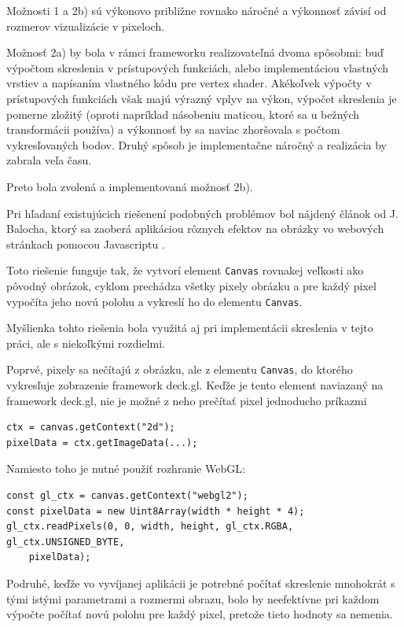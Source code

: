 Možnosti 1 a 2b) sú výkonovo približne rovnako náročné a výkonnosť závisí od rozmerov vizualizácie v pixeloch.

Možnosť 2a) by bola v rámci frameworku realizovateľná dvoma spôsobmi: buď výpočtom skreslenia v prístupových funkciách, alebo implementáciou vlastných vrstiev a napísaním vlastného kódu pre vertex shader. Akékoľvek výpočty v prístupových funkciách však majú výrazný vplyv na výkon, výpočet skreslenia je pomerne zložitý (oproti napríklad násobeniu maticou, ktoré sa u bežných transformácii používa) a výkonnosť by sa naviac zhoršovala s počtom vykresľovaných bodov. Druhý spôsob je implementačne náročný a realizácia by zabrala veľa času.

Preto bola zvolená a implementovaná možnosť 2b).

Pri hľadaní existujúcich riešenení podobných problémov bol nájdený článok od J. Balocha, ktorý sa zaoberá aplikáciou rôznych efektov na obrázky vo webových stránkach pomocou Javascriptu \cite{baloch_distortion_in_js}.

Toto riešenie funguje tak, že vytvorí element \texttt{Canvas} rovnakej veľkosti ako pôvodný obrázok, cyklom prechádza všetky pixely obrázku a pre každý pixel vypočíta jeho novú polohu a vykreslí ho do elementu \texttt{Canvas}.

Myšlienka tohto riešenia bola využitá aj pri implementácii skreslenia v tejto práci, ale s niekoľkými rozdielmi.

Poprvé, pixely sa nečítajú z obrázku, ale z elementu \texttt{Canvas}, do ktorého vykresľuje zobrazenie framework deck.gl. Keďže je tento element naviazaný na framework deck.gl, nie je možné z neho prečítať pixel jednoducho príkazmi 

\begin{lstlisting}
ctx = canvas.getContext("2d");
pixelData = ctx.getImageData(...);
\end{lstlisting}

Namiesto toho je nutné použiť rozhranie WebGL:

\begin{lstlisting}
const gl_ctx = canvas.getContext("webgl2");
const pixelData = new Uint8Array(width * height * 4);
gl_ctx.readPixels(0, 0, width, height, gl_ctx.RGBA, gl_ctx.UNSIGNED_BYTE, 
    pixelData);
\end{lstlisting}

Podruhé, keďže vo vyvíjanej aplikácii je potrebné počítať skreslenie mnohokrát s tými istými parametrami a rozmermi obrazu, bolo by neefektívne pri každom výpočte počítať novú polohu pre každý pixel, pretože tieto hodnoty sa nemenia.

